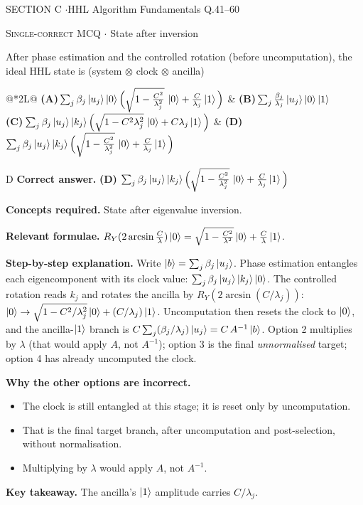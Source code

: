 \documentclass[11pt,a4paper]{article}
\newcommand{\optlabel}[1]{\textbf{(#1)}}
\newcommand{\correctlabel}[1]{\textcolor{okgreen}{\textbf{(#1)}\,\ding{51}}}
\newenvironment{qitem}[1]{\begin{list}{}{\setlength{\leftmargin}{3.3em}\setlength{\labelwidth}{3.1em}%
  \setlength{\labelsep}{0.2em}\setlength{\topsep}{3pt}\setlength{\parsep}{3pt}}\item[\textbf{Q.#1}\hfill]}{\end{list}}
\newcommand{\qmeta}[2]{{\footnotesize\color{black!60}\textsc{#1} \;$\cdot$\; #2}\par}
\begin{document}
\newpage

\begin{sectionbanner}SECTION C \enspace$\cdot$\enspace HHL Algorithm Fundamentals \hfill Q.41--60\end{sectionbanner}

\begin{qitem}{41}
\qmeta{Single-correct MCQ}{State after inversion}
After phase estimation and the controlled rotation (before uncomputation), the ideal HHL state is (system $\otimes$ clock $\otimes$ ancilla)
\par\smallskip\noindent\begin{tabularx}{\linewidth}{@{}*{2}{L}@{}}
\optlabel{A}\,$\sum_j\beta_j\ket{u_j}\ket{0}\Big(\sqrt{1 - \tfrac{C^2}{\lambda_j^2}}\,\ket0 + \tfrac{C}{\lambda_j}\ket1\Big)$ & \optlabel{B}\,$\sum_j\tfrac{\beta_j}{\lambda_j}\ket{u_j}\ket0\ket1$ \\[3pt]
\optlabel{C}\,$\sum_j\beta_j\ket{u_j}\ket{k_j}\Big(\sqrt{1 - C^2\lambda_j^2}\,\ket0 + C\lambda_j\ket1\Big)$ & \correctlabel{D}\,$\sum_j\beta_j\ket{u_j}\ket{k_j}\Big(\sqrt{1 - \tfrac{C^2}{\lambda_j^2}}\,\ket0 + \tfrac{C}{\lambda_j}\ket1\Big)$
\end{tabularx}
\end{qitem}
\begin{solbox}{D}
\textbf{\color{brand}Correct answer.} \textcolor{okgreen}{\textbf{(D)}} $\sum_j\beta_j\ket{u_j}\ket{k_j}\Big(\sqrt{1 - \tfrac{C^2}{\lambda_j^2}}\,\ket0 + \tfrac{C}{\lambda_j}\ket1\Big)$

\textbf{\color{brand}Concepts required.} State after eigenvalue inversion.

\textbf{\color{brand}Relevant formulae.} $R_Y(2\arcsin\frac{C}{\lambda})\ket0 = \sqrt{1 - \frac{C^2}{\lambda^2}}\ket0 + \frac{C}{\lambda}\ket1$.

\textbf{\color{brand}Step-by-step explanation.} Write $\ket b = \sum_j\beta_j\ket{u_j}$. Phase estimation entangles each eigencomponent with its clock value: $\sum_j\beta_j\ket{u_j}\ket{k_j}\ket0$. The controlled rotation reads $k_j$
and rotates the ancilla by $R_Y(2\arcsin(C/\lambda_j))$: $\ket0 \to \sqrt{1 - C^2/\lambda_j^2}\ket0 + (C/\lambda_j)\ket1$. Uncomputation then resets the clock to $\ket0$, and the ancilla-$\ket1$
branch is $C\sum_j(\beta_j/\lambda_j)\ket{u_j} = C\,A^{-1}\ket b$. Option 2 multiplies by $\lambda$ (that would apply $A$, not $A^{-1}$); option 3 is the final
\emph{unnormalised} target; option 4 has already uncomputed the clock.

\textbf{\color{brand}Why the other options are incorrect.}
\begin{itemize}[leftmargin=2.4em, itemsep=1pt, topsep=2pt]
\item[\textbf{(A)}] The clock is still entangled at this stage; it is reset only by uncomputation.
\item[\textbf{(B)}] That is the final target branch, after uncomputation and post-selection, without normalisation.
\item[\textbf{(C)}] Multiplying by $\lambda$ would apply $A$, not $A^{-1}$.
\end{itemize}
\textbf{\color{brand}Key takeaway.} The ancilla's $\ket1$ amplitude carries $C/\lambda_j$.
\end{solbox}
\end{document}
